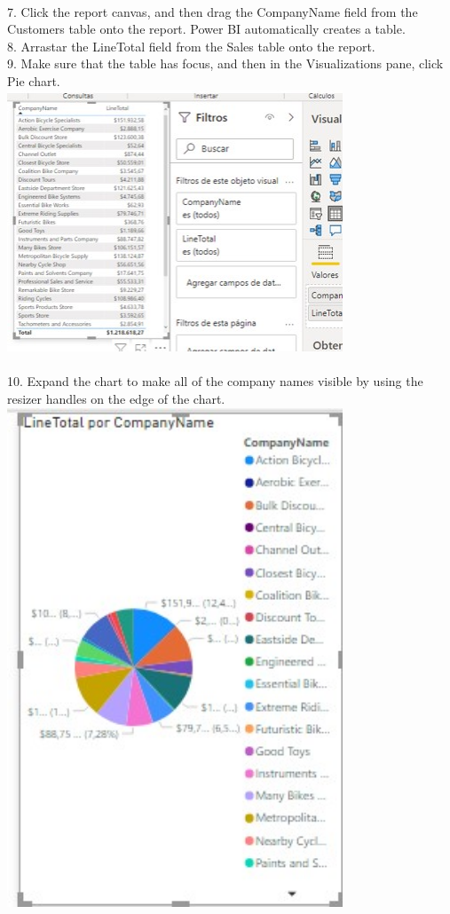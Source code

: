 \documentclass[preprint,12pt]{elsarticle}
\begin{document}
\begin{itemize}
			\\ 7. Click the report canvas, and then drag the CompanyName field from the Customers table onto the report.
			Power BI automatically creates a table.
			\\ 8. Arrastar the LineTotal field from the Sales table onto the report.
		\\ 	9. Make sure that the table has focus, and then in the Visualizations pane, click Pie chart.
			\\ \includegraphics[width=10cm]{./IMAGENES/4.9} \\
			\\ 10. Expand the chart to make all of the company names visible by using the resizer handles on the edge
			of the chart.
				\\ \includegraphics[width=10cm]{./IMAGENES/4.10} \\

\end{itemize}
\end{document}
